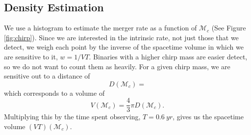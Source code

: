\subsection{Density Estimation}

We use a histogram to estimate the merger rate as a function of $\mathcal{M}_c$ (See Figure \ref{fig:chirp}). Since we are interested in the intrinsic rate, not just those that we detect, we weigh each point by the inverse of the spacetime volume in which we are sensitive to it, $w = 1 / VT$. Binaries with a higher chirp mass are easier detect, so we do not want to count them as heavily. For a given chirp mass, we are sensitive out to a distance of
%
\begin{equation}
  D(\mathcal{M}_c) =
\end{equation}
%
which corresponds to a volume of
%
\begin{equation}
  V(\mathcal{M}_c) = \frac{4}{3} \pi D(\mathcal{M}_c).
\end{equation}
%
Multiplying this by the time spent observing, $T = \SI{0.6}{yr}$, gives us the spacetime volume $(VT)(\mathcal{M}_c)$.